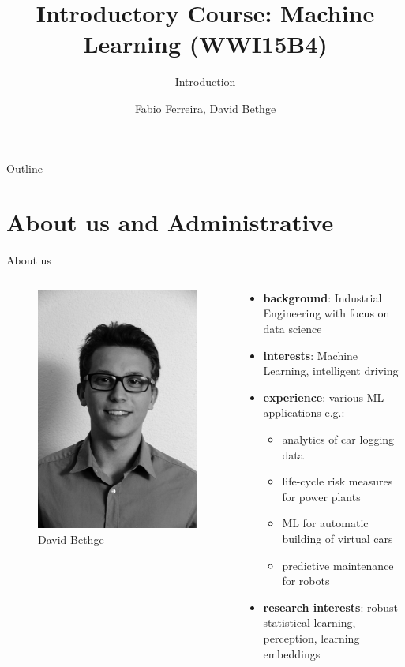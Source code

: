 \documentclass{beamer}
\title[]{Introductory Course: Machine Learning (WWI15B4)}
\subtitle{Introduction}
\author{Fabio Ferreira, David Bethge}
\institute{DHBW Karlsruhe}
\date{}
\begin{document}
\begin{frame}
  \titlepage

\end{frame}
\begin{frame}{Outline}
  \tableofcontents
\end{frame}




\section{About us and Administrative}


\begin{frame}{About us}

\begin{columns}
\begin{column}{0.35\textwidth}
   \begin{figure}
	\includegraphics[width=0.6\linewidth]{david_black_and_white}
	\caption*{David Bethge}
\end{figure}
\end{column}
\begin{column}{0.65\textwidth}  %
    \begin{itemize}
	\item \textbf{background}: Industrial Engineering with focus on data science
	\item \textbf{interests}: Machine Learning, intelligent driving
	\item \textbf{experience}: various ML applications e.g.:
    \begin{itemize}
    \item analytics of car logging data 
    \item life-cycle risk measures for power plants 
    \item ML for automatic building of virtual cars
    \item predictive maintenance for robots 
    \end{itemize}
	\item \textbf{research interests}: robust statistical learning, perception, learning embeddings


\end{itemize}
\end{column}
\end{columns}
\end{frame}
\end{document}
